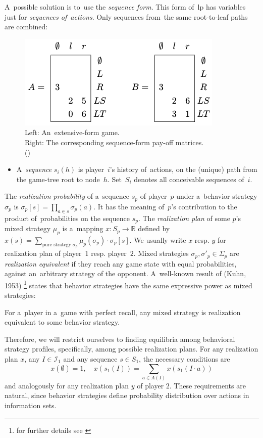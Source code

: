 A~possible solution is to~use the \emph{sequence form}.
This form of~\acrshort{lp} has variables just for \emph{sequences of~actions}.
Only sequences from~the same root-to-leaf paths are combined:
\begin{figure}[H]
  \centering
  \tiny
  \def\svgwidth{.5\textwidth}
  
  \includegraphics[width=.4\textwidth]{../img/sequence-form.png}
  \def\captionTitle{Left: An~extensive-form game. \\Right: The corresponding sequence-form pay-off matrices.}
  \caption[The sequence-form pay-off matrices]{\captionTitle{} \\(\cite[p.~67]{AGT07})}
  \label{fig:sequence-form}
\end{figure}
\noindent
\begin{itemize}
  \item A~\emph{sequence} $s_i(h)$ is player~$i$'s history of~actions, on the (unique) path from the game-tree root to node~$h$.
    Set~$S_i$ denotes all conceivable sequences of~$i$.
\end{itemize}
The \emph{realization probability} of a~sequence $s_p$ of player~$p$ under a~behavior strategy $\sigma _p$ is $\sigma _p [s] = \prod_{a \in s} \sigma _p(a)$.
It has the meaning of~$p$'s contribution to the product of~probabilities on the sequence $s_p$.
The \emph{realization plan} of some $p$'s mixed strategy $\mu_p$ is a~mapping $x\colon S_p \to \mathbb{R}$ defined by
$x(s) = \sum _{\textrm{pure strategy } \sigma _p} \mu _p (\sigma _p) \cdot \sigma _p [s]$.
We usually write $x$ resp. $y$ for realization plan of player~$1$ resp. player~$2$.
Mixed strategies $\sigma _p, \sigma' _p \in \Sigma _p$ are \emph{realization equivalent} if they reach any game state with equal probabilities, against an~arbitrary strategy of the opponent.
A~well-known result of (Kuhn, 1953)%
\footnote{for further details see \cite{AGT07}}
states that behavior strategies have the same expressive power as mixed strategies:
\begin{thm}
For a~player in a~game with perfect recall, any mixed strategy is realization equivalent to some behavior strategy.
\end{thm}
Therefore, we will restrict ourselves to finding equilibria among behavioral strategy profiles, specifically, among possible realization plans.
For any realization plan $x$, any $I \in \mathcal{I}_1$ and any sequence $s\in S_1$, the necessary conditions are
\begin{equation}
\label{seq-cond}
    x(\emptyset) = 1, \quad x(s_1(I)) = \sum _{a \in A(I)} x(s_1(I \cdot a))
\end{equation}
and analogously for any realization plan $y$ of player $2$.
These requirements are natural, since behavior strategies define probability distribution over actions in information sets.

